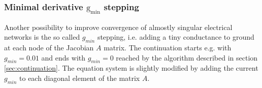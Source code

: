 \subsubsection{Minimal derivative $\mathrm{g_{min}}$ stepping}

Another possibility to improve convergence of almostly singular
electrical networks is the so called $g_{min}$ stepping, i.e. adding a
tiny conductance to ground at each node of the Jacobian $A$ matrix.
The continuation starts e.g. with $g_{min} = 0.01$ and ends with
$g_{min} = 0$ reached by the algorithm described in section
\ref{sec:continuation}.  The equation system is slightly modified by
adding the current $g_{min}$ to each diagonal element of the matrix
$A$.
